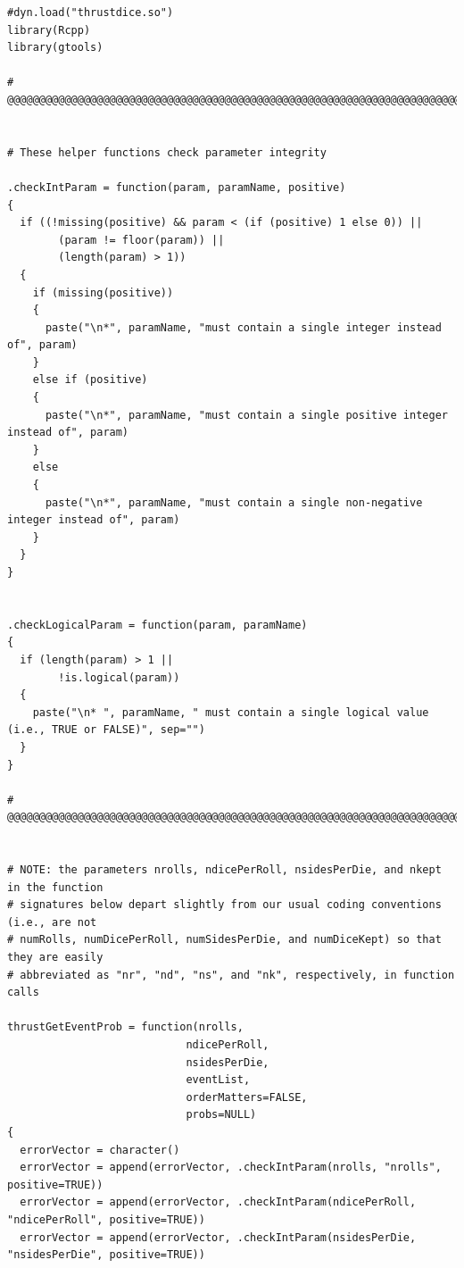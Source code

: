 \documentclass[12pt]{article}
\begin{document}
\begin{lstlisting}
#dyn.load("thrustdice.so")
library(Rcpp)
library(gtools)

# @@@@@@@@@@@@@@@@@@@@@@@@@@@@@@@@@@@@@@@@@@@@@@@@@@@@@@@@@@@@@@@@@@@@@@@@@@@@@@@@@@@@


# These helper functions check parameter integrity

.checkIntParam = function(param, paramName, positive)
{
  if ((!missing(positive) && param < (if (positive) 1 else 0)) ||
        (param != floor(param)) ||
        (length(param) > 1))
  {
    if (missing(positive))  
    {
      paste("\n*", paramName, "must contain a single integer instead of", param)
    }
    else if (positive)
    {
      paste("\n*", paramName, "must contain a single positive integer instead of", param)
    }
    else 
    {
      paste("\n*", paramName, "must contain a single non-negative integer instead of", param)
    }
  }
}


.checkLogicalParam = function(param, paramName)
{
  if (length(param) > 1 ||
        !is.logical(param))
  {
    paste("\n* ", paramName, " must contain a single logical value (i.e., TRUE or FALSE)", sep="")
  }
}

# @@@@@@@@@@@@@@@@@@@@@@@@@@@@@@@@@@@@@@@@@@@@@@@@@@@@@@@@@@@@@@@@@@@@@@@@@@@@@@@@@@@@


# NOTE: the parameters nrolls, ndicePerRoll, nsidesPerDie, and nkept in the function
# signatures below depart slightly from our usual coding conventions (i.e., are not 
# numRolls, numDicePerRoll, numSidesPerDie, and numDiceKept) so that they are easily 
# abbreviated as "nr", "nd", "ns", and "nk", respectively, in function calls

thrustGetEventProb = function(nrolls,
                            ndicePerRoll,
                            nsidesPerDie,
                            eventList,
                            orderMatters=FALSE,
                            probs=NULL)
{  
  errorVector = character()
  errorVector = append(errorVector, .checkIntParam(nrolls, "nrolls", positive=TRUE))
  errorVector = append(errorVector, .checkIntParam(ndicePerRoll, "ndicePerRoll", positive=TRUE))
  errorVector = append(errorVector, .checkIntParam(nsidesPerDie, "nsidesPerDie", positive=TRUE))
  

\end{lstlisting}
\end{document}
